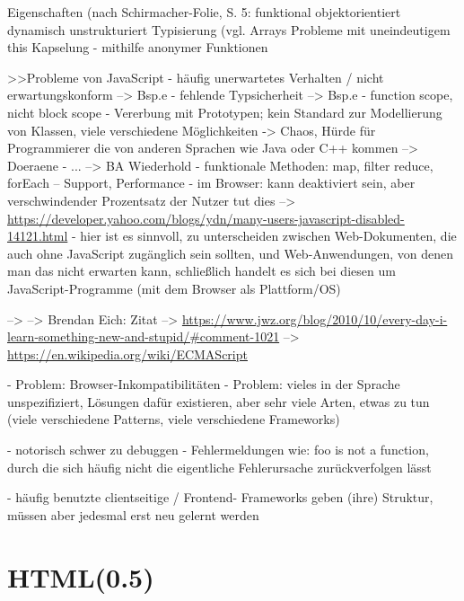 \documentclass[a4paper, 12pt, listof=totoc, bibliography=totoc]{scrreprt}
\begin{document}
Eigenschaften (nach Schirmacher-Folie, S. 5: %
	funktional
	objektorientiert
	dynamisch
	unstrukturiert
	Typisierung (vgl. %
	Arrays
	Probleme mit uneindeutigem this
	Kapselung - mithilfe anonymer Funktionen
	
                             
>>Probleme von JavaScript
- häufig unerwartetes Verhalten / nicht erwartungskonform  -->  Bsp.e
- fehlende Typsicherheit  -->  Bsp.e
- function scope, nicht block scope
- Vererbung mit Prototypen; kein Standard zur Modellierung von Klassen, viele verschiedene Möglichkeiten  ->  Chaos, Hürde für Programmierer die von anderen Sprachen wie Java oder C++ kommen
-->  Doeraene
- ...
-->  BA Wiederhold
- funktionale Methoden: map, filter reduce, forEach -- Support, Performance
- im Browser: kann deaktiviert sein, aber verschwindender Prozentsatz der Nutzer tut dies  -->  \url{https://developer.yahoo.com/blogs/ydn/many-users-javascript-disabled-14121.html}
	- hier ist es sinnvoll, zu unterscheiden zwischen Web-Dokumenten, die auch ohne JavaScript zugänglich sein sollten, und Web-Anwendungen, von denen man das nicht erwarten kann, schließlich handelt es sich bei diesen um JavaScript-Programme (mit dem Browser als Plattform/OS)
	\cite[S.311]{flanagan2011.JDG}

-->  \cite{flanagan2011.JDG}
-->  \cite{crockford2008.JSG}
Brendan Eich: Zitat  -->  \url{https://www.jwz.org/blog/2010/10/every-day-i-learn-something-new-and-stupid/#comment-1021}
-->  \url{https://en.wikipedia.org/wiki/ECMAScript}

- Problem: Browser-Inkompatibilitäten
- Problem: vieles in der Sprache unspezifiziert, Lösungen dafür existieren, aber sehr viele Arten, etwas zu tun (viele verschiedene Patterns, viele verschiedene Frameworks)

- notorisch schwer zu debuggen - Fehlermeldungen wie: foo is not a function, durch die sich häufig nicht die eigentliche Fehlerursache zurückverfolgen lässt


- häufig benutzte clientseitige / Frontend- Frameworks geben (ihre) Struktur, müssen aber jedesmal erst neu gelernt werden


\section{HTML(0.5)}

\end{document}
